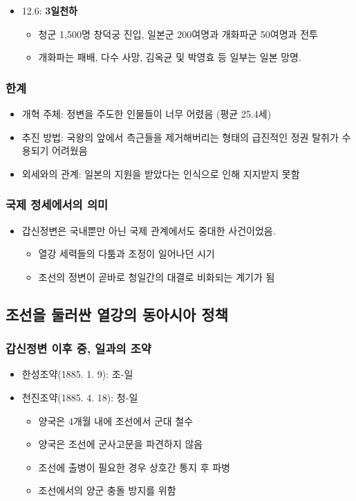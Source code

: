 \begin{itemize}
    \item 12.6: \textbf{3일천하}
    \begin{itemize}
        \item 청군 1,500명 창덕궁 진입, 일본군 200여명과 개화파군 50여명과 전투
        \item 개화파는 패배, 다수 사망, 김옥균 및 박영효 등 일부는 일본 망명.
    \end{itemize}
\end{itemize}

\subsubsection*{한계}
\begin{itemize}
    \item 개혁 주체: 정변을 주도한 인물들이 너무 어렸음 (평균 25.4세)
    \item 추진 방법: 국왕의 앞에서 측근들을 제거해버리는 형태의 급진적인 정권 탈취가 수용되기 어려웠음
    \item 외세와의 관계: 일본의 지원을 받았다는 인식으로 인해 지지받지 못함
\end{itemize}

\subsubsection*{국제 정세에서의 의미}
\begin{itemize}
    \item 갑신정변은 국내뿐만 아닌 국제 관계에서도 중대한 사건이었음.
    \begin{itemize}
        \item 열강 세력들의 다툼과 조정이 일어나던 시기
        \item 조선의 정변이 곧바로 청일간의 대결로 비화되는 계기가 됨
    \end{itemize}
\end{itemize}

\subsection{조선을 둘러싼 열강의 동아시아 정책}

\subsubsection*{갑신정변 이후 중, 일과의 조약}
\begin{itemize}
    \item 한성조약(1885. 1. 9): 조-일
    \item 천진조약(1885. 4. 18): 청-일
    \begin{itemize}
        \item 양국은 4개월 내에 조선에서 군대 철수
        \item 양국은 조선에 군사고문을 파견하지 않음
        \item 조선에 출병이 필요한 경우 상호간 통지 후 파병
        \item 조선에서의 양군 충돌 방지를 위함
    \end{itemize}
\end{itemize}

